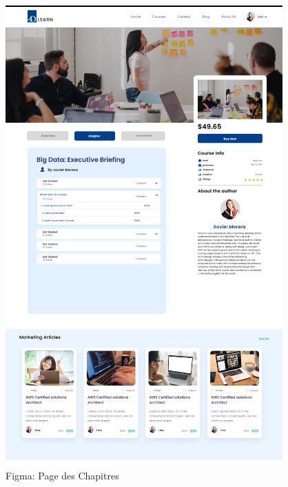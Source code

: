 \begin{figure}[H]
\begin{minipage}{0.45\textwidth}
        \includegraphics[width=\textwidth]{Figures/Chapter.PNG}
        \caption{Figma: Page des Chapitres }
    \end{minipage}
    
\end{figure}

